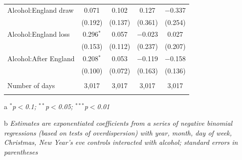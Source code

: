 \documentclass[12pt, a4paper]{article}
\begin{document}
\begin{table}[htp]
{\begin{threeparttable}
\begin{tabular}{@{\extracolsep{5pt}}lcccc}
  Alcohol:England draw & 0.071 & 0.102 & 0.127 & $-$0.337 \\ 
  & (0.192) & (0.137) & (0.361) & (0.254) \\ 
  Alcohol:England loss & 0.296$^{*}$ & 0.057 & $-$0.023 & 0.027 \\ 
  & (0.153) & (0.112) & (0.237) & (0.207) \\ 
  Alcohol:After England & 0.208$^{*}$ & 0.053 & $-$0.119 & $-$0.158 \\ 
  & (0.100) & (0.072) & (0.163) & (0.136) \\ 
 \hline \\[-1.8ex] 
Number of days & 3,017 & 3,017 & 3,017 & 3,017 \\ 
\hline 
\hline \\[-1.8ex] 
\end{tabular} 
\begin{tablenotes}
     \item[a] \textit{$^{*}$p$<$0.1; $^{**}$p$<$0.05; $^{***}$p$<$0.01}
      \item[b] \textit{Estimates are exponentiated coefficients from a series of negative binomial regressions (based on tests of overdispersion)  with year, month, day of week, Christmas, New Year's eve controls interacted with alcohol; standard errors in parentheses}
    \end{tablenotes}
\end{threeparttable} }
\end{table}

\newpage
\end{document}

